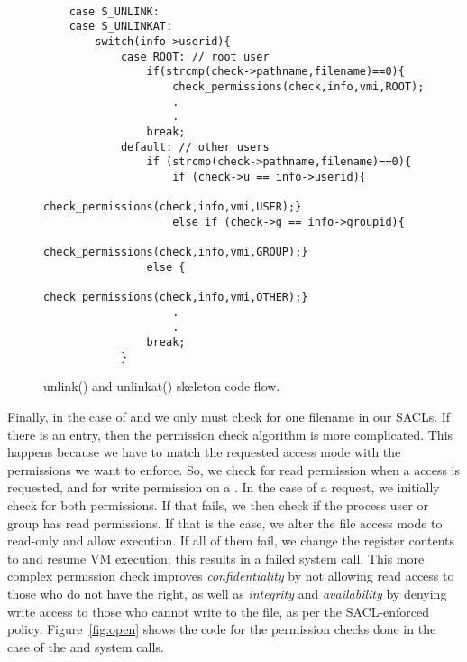 \begin{figure}[ht]
	\selectfont
	\begin{lstlisting}[style=CStyle]
	
	case S_UNLINK:
	case S_UNLINKAT:
		switch(info->userid){
			case ROOT: // root user
				if(strcmp(check->pathname,filename)==0){
					check_permissions(check,info,vmi,ROOT);			
					.
					.
				break;
			default: // other users
				if (strcmp(check->pathname,filename)==0){
					if (check->u == info->userid){
						check_permissions(check,info,vmi,USER);}
					else if (check->g == info->groupid){
						check_permissions(check,info,vmi,GROUP);}
				else {
					check_permissions(check,info,vmi,OTHER);}
					.
					.
				break;
			}
	\end{lstlisting}
	\caption{unlink() and unlinkat() skeleton code flow.}
	\label{fig:unlink}
\end{figure}

\par Finally, in the case of  and  we only must check for one filename in our \ac{SACL}s. If there is an entry, then the permission check algorithm is more complicated. This happens because we have to match the requested access mode with the permissions we want to enforce. So, we check for read permission when a  access is requested, and for write permission on a . In the case of a  request, we initially check for both permissions. If that fails, we then check if the process user or group has read permissions. If that is the case, we alter the file access mode to read-only and allow execution. If all of them fail, we change the  register contents to  and resume \ac{VM} execution; this results in a failed system call. This more complex permission check improves \emph{confidentiality} by not allowing read access to those who do not have the right, as well as \emph{integrity} and \emph{availability} by denying write access to those who cannot write to the file, as per the \ac{SACL}-enforced policy. Figure~\ref{fig:open} shows the code for the permission checks done in the case of the  and  system calls.




